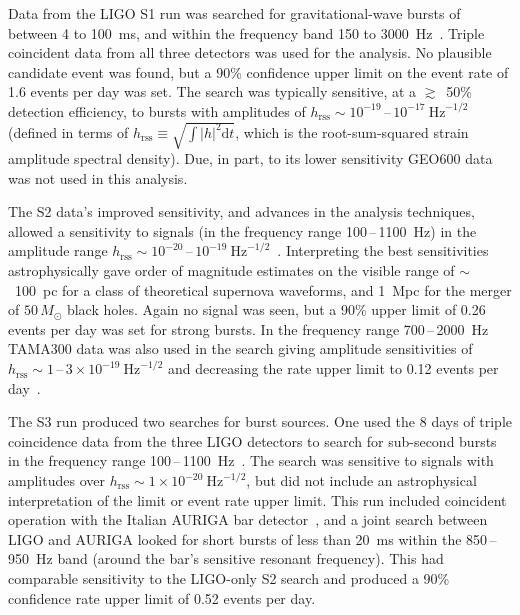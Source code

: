 Data from the LIGO S1 run was searched for gravitational-wave bursts of between 4 to 100~ms, and within the 
frequency band 150 to 3000~Hz~\cite{Abbott:2004b}. Triple coincident data from all three detectors was used 
for the analysis. No plausible candidate event was found, but a 90\% confidence upper limit on the event rate 
of 1.6 events per day was set. The search was typically sensitive, at a $\gtrsim$~50\% detection efficiency, 
to bursts with amplitudes of $h_{\mathrm{rss}}\sim10^{-19}$\,--\,$10^{-17} \mathrm{\ Hz}^{-1/2}$ (defined in
terms of $h_{\mathrm{rss}} \equiv \sqrt{\int|h|^2 \mathrm{d}t}$, which is the root-sum-squared strain
amplitude spectral density). Due, in part, to its lower sensitivity GEO600 data was not used in this 
analysis.

The S2 data's improved sensitivity, and advances in the analysis techniques, allowed a sensitivity to signals 
(in the frequency range 100\,--\,1100~Hz) in the amplitude range
$h_{\mathrm{rss}}\sim10^{-20}$\,--\,$10^{-19}\mathrm{\ Hz}^{-1/2}$~\cite{Abbott:2005a}. Interpreting the best
sensitivities astrophysically gave order of magnitude estimates on the visible range of $\sim$~100~pc for a 
class of theoretical supernova waveforms, and 1~Mpc for the merger of $50\,M_{\odot}$ black holes. Again no 
signal was seen, but a 90\% upper limit of 0.26 events per day was set for strong bursts. In the frequency 
range 700\,--\,2000~Hz TAMA300 data was also used in the search giving amplitude sensitivities of
$h_{\mathrm{rss}}\sim1$\,--\,$3\times10^{-19} \mathrm{\ Hz}^{-1/2}$ and decreasing the rate upper limit to 
0.12 events per day~\cite{Abbott:2005c}.

The S3 run produced two searches for burst sources. One used the 8 days of triple coincidence data from the 
three LIGO detectors to search for sub-second bursts in the frequency range 
100\,--\,1100~Hz~\cite{Abbott:2006a}. The search was sensitive to signals with amplitudes over
$h_{\mathrm{rss}}\sim1\times10^{-20}\mathrm{\ Hz}^{-1/2}$, but did not include an astrophysical 
interpretation of the limit or event rate upper limit. This run included coincident operation with the Italian
AURIGA bar detector~\cite{Baggio:2008}, and a joint search between LIGO and AURIGA looked for short bursts of 
less than 20~ms within the 850\,--\,950~Hz band (around the bar's sensitive resonant frequency). This had 
comparable sensitivity to the LIGO-only S2 search and produced a 90\% confidence rate upper limit of
0.52 events per day.

